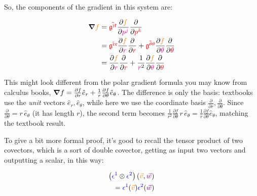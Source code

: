 So, the components of the gradient in this system are:

\begin{align*}
    \grad{\begingroup\color{orange}f\endgroup} &=  
    \begingroup\color{red}\mathfrak{\tilde{g^{jk}}}\endgroup \frac{\partial \begingroup\color{orange}f\endgroup}{\partial \begingroup\color{magenta}p^j\endgroup}
    \frac{\partial}{\partial \begingroup\color{red}p^k\endgroup}\\
    &= \begingroup\color{red}\mathfrak{\tilde{g^{rr}}}\endgroup \frac{\partial \begingroup\color{orange}f\endgroup}{\partial \begingroup\color{magenta}r\endgroup}
    \frac{\partial}{\partial \begingroup\color{red}r\endgroup} +
    \begingroup\color{red}\mathfrak{\tilde{g^{\theta\theta}}}\endgroup \frac{\partial \begingroup\color{orange}f\endgroup}{\partial \begingroup\color{magenta}\theta\endgroup}
    \frac{\partial}{\partial \begingroup\color{red}\theta\endgroup}\\
    &=  \frac{\partial \begingroup\color{orange}f\endgroup}{\partial \begingroup\color{magenta}r\endgroup} \frac{\partial}{\partial \begingroup\color{red}r\endgroup} +
    \frac{1}{\begingroup\color{magenta}r\endgroup^2} \frac{\partial \begingroup\color{orange}f\endgroup}{\partial \begingroup\color{magenta}\theta\endgroup} \frac{\partial}{\partial \begingroup\color{red}\theta\endgroup}
\end{align*}

This might look different from the polar gradient formula you may know from calculus books, $\grad{f} = \frac{\partial f}{\partial r}\hat{e}_r + \frac{1}{r}\frac{\partial f}{\partial \theta}\hat{e}_\theta$.
The difference is only the basis: textbooks use the \textit{unit} vectors $\hat{e}_r, \hat{e}_\theta$, while here we use the coordinate basis
$\frac{\partial}{\partial r}, \frac{\partial}{\partial \theta}$. Since $\frac{\partial}{\partial \theta} = r\,\hat{e}_\theta$ (it has length $r$), the second term becomes
$\frac{1}{r^2}\frac{\partial f}{\partial \theta}\, r\,\hat{e}_\theta = \frac{1}{r}\frac{\partial f}{\partial \theta}\hat{e}_\theta$, matching the textbook result.

To give a bit more formal proof, it's good to recall the tensor product of two covectors, which is a sort of double covector, 
getting as input two vectors and outputting a scalar, in this way:

\begin{align*}
    \left(\begingroup\color{blue}\epsilon^1\endgroup \otimes \begingroup\color{blue}\epsilon^2\endgroup\right)
    \left(\begingroup\color{orange}\vec{v}\endgroup, \begingroup\color{violet}\vec{w}\endgroup\right)\\
    = \begingroup\color{blue}\epsilon^1\endgroup (\begingroup\color{orange}\vec{v}\endgroup)
    \begingroup\color{blue}\epsilon^2\endgroup (\begingroup\color{violet}\vec{w}\endgroup)
\end{align*}

